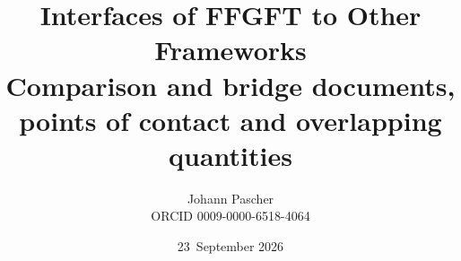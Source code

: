 \documentclass[11pt,a4paper]{report}
\title{Interfaces of FFGFT to Other Frameworks\\[0.5em]\large Comparison and bridge documents, points of contact and overlapping quantities}
\date{23~September 2026}
\author{Johann Pascher\\\small ORCID 0009-0000-6518-4064}
\begin{document}
\renewcommand{\thechapter}{}
\renewcommand{\thesection}{\arabic{section}}
\maketitle
\tableofcontents

\end{document}
